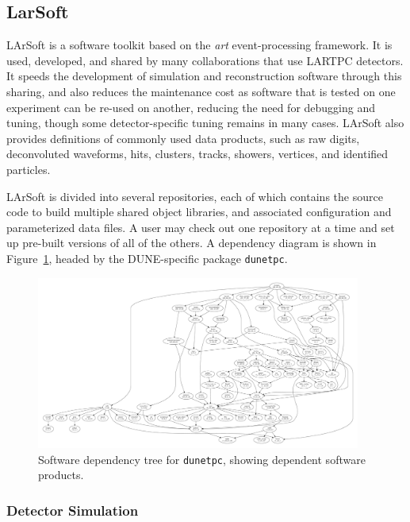 \subsection{LarSoft}

LArSoft is a software toolkit based on the {\it art} event-processing framework.  It is used, developed, and
shared by many collaborations that use LARTPC detectors.  It speeds the development of simulation and reconstruction
software through this sharing, and also reduces the maintenance cost as software that is tested on one
experiment can be re-used on another, reducing the need for debugging and tuning, though some detector-specific
tuning remains in many cases.  LArSoft also provides definitions of commonly used data products, such as raw digits,
deconvoluted waveforms, hits, clusters, tracks, showers, vertices, and identified particles.

LArSoft is divided into several repositories, each of which contains the source code to build multiple shared
object libraries, and associated configuration and parameterized data files.  A user may check out one repository
at a time and set up pre-built versions of all of the others.  A dependency diagram is shown in 
Figure~\ref{fig:swdeptree}, headed by the DUNE-specific package {\tt dunetpc}.

\begin{figure}
\includegraphics[width=0.95\textwidth]{software-computing/figures/dtree.pdf}
\caption{\label{fig:swdeptree} Software dependency tree for {\tt dunetpc}, showing dependent software products.}
\end{figure}

\subsubsection{Detector Simulation}

